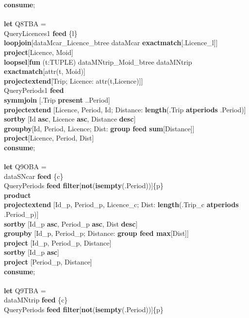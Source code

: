 \documentclass[a4paper]{article}
\newcommand{\op}[1]{\textbf{#1}}
\begin{document}
\begin{scriptsize}
\begin{tabbing}
\op{consume};\\
\\
\op{let} Q8TBA =\\
\>QueryLicences1 \op{feed} \{l\}\\
\>\>\op{loopjoin}[dataMcar\_Licence\_btree dataMcar
\op{exactmatch}[.Licence\_l]]\\
\>\>\op{project}[Licence, Moid]\\
\>\>\op{loopsel}[\op{fun} (t:TUPLE) dataMNtrip\_Moid\_btree dataMNtrip
\op{exactmatch}[attr(t, Moid)]\\
\>\>\>\op{projectextend}[Trip; Licence: attr(t,Licence)]]\\
\>QueryPeriods1 \op{feed}\\
\>\op{symmjoin} [.Trip \op{present} ..Period]\\
\>\op{projectextend} [Licence, Period, Id; Distance: \op{length}(.Trip
\op{atperiods} .Period)]\\
\>\op{sortby} [Id \op{asc}, Licence \op{asc}, Distance \op{desc}]\\
\>\op{groupby}[Id, Period, Licence; Dist: \op{group feed sum}[Distance]]\\
\>\op{project}[Licence, Period, Dist]\\
\op{consume};\\
\\
\op{let} Q9OBA =\\
\>dataSNcar \op{feed} \{c\}\\
\>QueryPeriods \op{feed filter}[\op{not}(\op{isempty}(.Period))]\{p\}\\
\>\op{product}\\
\>\op{projectextend} [Id\_p, Period\_p, Licence\_c; Dist: \op{length}(.Trip\_c
\op{atperiods} .Period\_p)]\\
\>\op{sortby} [Id\_p \op{asc}, Period\_p \op{asc}, Dist \op{desc}]\\
\>\op{groupby} [Id\_p, Period\_p; Distance: \op{group feed max}[Dist]]\\
\>\op{project} [Id\_p, Period\_p, Distance]\\
\>\op{sortby} [Id\_p \op{asc}]\\
\>\op{project} [Period\_p, Distance]\\
\op{consume};\\
\\
\op{let} Q9TBA =\\
\>dataMNtrip \op{feed} \{c\}\\
\>QueryPeriods \op{feed filter}[\op{not}(\op{isempty}(.Period))]\{p\}\\

\end{tabbing}
\end{scriptsize}
\end{document}

